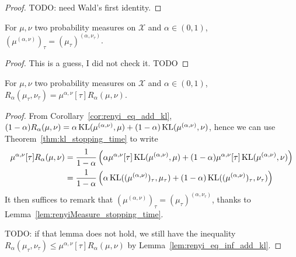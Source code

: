 \begin{proof}
TODO: need Wald's first identity.
\end{proof}


\begin{lemma}
  \label{lem:renyiMeasure_stopping_time}
  For $\mu, \nu$ two probability measures on $\mathcal X$ and $\alpha \in (0,1)$, $(\mu^{(\alpha, \nu)})_\tau = (\mu_\tau)^{(\alpha, \nu_\tau)}$.
\end{lemma}

\begin{proof}
This is a guess, I did not check it. TODO
\end{proof}


\begin{theorem}
  \label{thm:renyi_stopping_time}
  For $\mu, \nu$ two probability measures on $\mathcal X$ and $\alpha \in (0,1)$,
  $R_\alpha(\mu_\tau, \nu_\tau) = \mu^{\alpha, \nu}[\tau] R_\alpha(\mu, \nu)$.
\end{theorem}

\begin{proof}
From Corollary~\ref{cor:renyi_eq_add_kl}, $(1 - \alpha) R_\alpha(\mu, \nu) = \alpha \operatorname{KL}(\mu^{(\alpha, \nu)}, \mu) + (1 - \alpha)\operatorname{KL}(\mu^{(\alpha, \nu)}, \nu)$, hence we can use Theorem~\ref{thm:kl_stopping_time} to write
\begin{align*}
\mu^{\alpha, \nu}[\tau] R_\alpha(\mu, \nu)
&= \frac{1}{1 - \alpha}\left(\alpha \mu^{\alpha, \nu}[\tau]\operatorname{KL}(\mu^{(\alpha, \nu)}, \mu) + (1 - \alpha)\mu^{\alpha, \nu}[\tau]\operatorname{KL}(\mu^{(\alpha, \nu)}, \nu) \right)
\\
&= \frac{1}{1 - \alpha}\left(\alpha \operatorname{KL}((\mu^{(\alpha, \nu)})_\tau, \mu_\tau) + (1 - \alpha)\operatorname{KL}((\mu^{(\alpha, \nu)})_\tau, \nu_\tau) \right)
\end{align*}
It then suffices to remark that $(\mu^{(\alpha, \nu)})_\tau = (\mu_\tau)^{(\alpha, \nu_\tau)}$, thanks to Lemma~\ref{lem:renyiMeasure_stopping_time}.

TODO: if that lemma does not hold, we still have the inequality $R_\alpha(\mu_\tau, \nu_\tau) \le \mu^{\alpha, \nu}[\tau] R_\alpha(\mu, \nu)$ by Lemma~\ref{lem:renyi_eq_inf_add_kl}.
\end{proof}